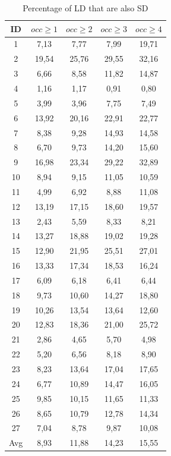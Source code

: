 \documentclass[12pt]{mitthesis}
\begin{document}
\begin{table}[H]
\caption{Percentage of LD that are also SD}
\label{table:sd_percentages}
\centering
\begin{tabular}{|c|c|c|c|c|}
\hline
    ID  & $occ\geq 1$ & $occ\geq 2$ & $occ\geq 3$ & $occ\geq 4$  \\
\hline
1	&	7,13	&	7,77	&	7,99	&	19,71	\\
2	&	19,54	&	25,76	&	29,55	&	32,16	\\
3	&	6,66	&	8,58	&	11,82	&	14,87	\\
4	&	1,16	&	1,17	&	0,91	&	0,80	\\
5	&	3,99	&	3,96	&	7,75	&	7,49	\\
6	&	13,92	&	20,16	&	22,91	&	22,77	\\
7	&	8,38	&	9,28	&	14,93	&	14,58	\\
8	&	6,70	&	9,73	&	14,20	&	15,60	\\
9	&	16,98	&	23,34	&	29,22	&	32,89	\\
10	&	8,94	&	9,15	&	11,05	&	10,59	\\
11	&	4,99	&	6,92	&	8,88	&	11,08	\\
12	&	13,19	&	17,15	&	18,60	&	19,57	\\
13	&	2,43	&	5,59	&	8,33	&	8,21	\\
14	&	13,27	&	18,88	&	19,02	&	19,28	\\
15	&	12,90	&	21,95	&	25,51	&	27,01	\\
16	&	13,33	&	17,34	&	18,53	&	16,24	\\
17	&	6,09	&	6,18	&	6,41	&	6,44	\\
18	&	9,73	&	10,60	&	14,27	&	18,80	\\
19	&	10,26	&	13,54	&	13,64	&	12,60	\\
20	&	12,83	&	18,36	&	21,00	&	25,72	\\
21	&	2,86	&	4,65	&	5,70	&	4,98	\\
22	&	5,20	&	6,56	&	8,18	&	8,90	\\
23	&	8,23	&	13,64	&	17,04	&	17,65	\\
24	&	6,77	&	10,89	&	14,47	&	16,05	\\
25	&	9,85	&	10,15	&	11,65	&	11,33	\\
26	&	8,65	&	10,79	&	12,78	&	14,34	\\
27	&	7,04	&	8,78	&	9,87	&	10,08	\\
\hline
Avg	&	8,93	&	11,88	&	14,23	&	15,55	\\
\hline
\end{tabular}
\end{table}
\end{document}
